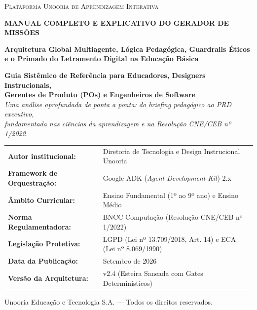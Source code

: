 \documentclass[11pt,a4paper]{article}
\begin{document}
\begin{titlepage}
  \centering
  \vspace*{1.0cm}
  {\Large\scshape\color{UnooriaTeal} Plataforma Unooria de Aprendizagem Interativa \par}
  \vspace{0.4cm}
  {\Huge\bfseries\color{UnooriaNavy} MANUAL COMPLETO E EXPLICATIVO DO GERADOR DE MISSÕES \par}
  \vspace{0.6cm}
  {\large\bfseries\color{UnooriaNavy} Arquitetura Global Multiagente, Lógica Pedagógica, Guardrails Éticos\\e o Primado do Letramento Digital na Educação Básica \par}
  \vspace{1.2cm}
  
  \begin{tcolorbox}[colback=white,colframe=UnooriaNavy,arc=3mm,width=0.92\textwidth]
    \centering
    \small\sffamily\color{UnooriaNavy}
    \textbf{Guia Sistêmico de Referência para Educadores, Designers Instrucionais,\\Gerentes de Produto (POs) e Engenheiros de Software}\\
    \vspace{0.2cm}
    \textit{Uma análise aprofundada de ponta a ponta: do briefing pedagógico ao PRD executivo,\\fundamentada nas ciências da aprendizagem e na Resolução CNE/CEB nº 1/2022.}
  \end{tcolorbox}

  \vspace{1.5cm}
  \begin{tabularx}{0.85\textwidth}{lX}
    \textbf{Autor institucional:} & Diretoria de Tecnologia e Design Instrucional Unooria \\
    \textbf{Framework de Orquestração:} & Google ADK (\textit{Agent Development Kit}) 2.x \\
    \textbf{Âmbito Curricular:} & Ensino Fundamental (1º ao 9º ano) e Ensino Médio \\
    \textbf{Norma Regulamentadora:} & BNCC Computação (Resolução CNE/CEB nº 1/2022) \\
    \textbf{Legislação Protetiva:} & LGPD (Lei nº 13.709/2018, Art. 14) e ECA (Lei nº 8.069/1990) \\
    \textbf{Data da Publicação:} & Setembro de 2026 \\
    \textbf{Versão da Arquitetura:} & v2.4 (Esteira Saneada com Gates Determinísticos) \\
  \end{tabularx}

  \vfill
  {\footnotesize\color{UnooriaGreyText} Unooria Educação e Tecnologia S.A. --- Todos os direitos reservados. \par}
\end{titlepage}
\end{document}

